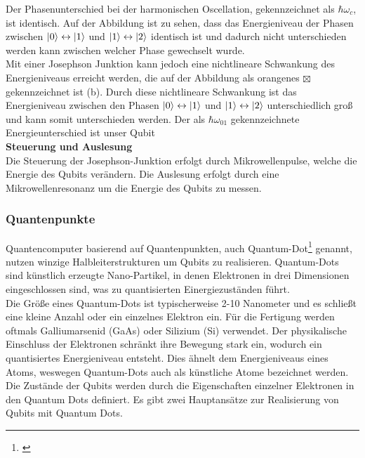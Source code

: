 Der Phasenunterschied bei der harmonischen Oscellation, gekennzeichnet als $\hbar\omega_c$, ist identisch. Auf der Abbildung ist zu sehen, dass das Energieniveau der Phasen zwischen $\ket{0} \leftrightarrow \ket{1}$
und $\ket{1} \leftrightarrow \ket{2}$ identisch ist und dadurch nicht unterschieden werden kann zwischen welcher Phase gewechselt wurde.\\

Mit einer Josephson Junktion kann jedoch eine nichtlineare Schwankung des Energieniveaus erreicht werden, die auf der Abbildung als orangenes $\boxtimes$ gekennzeichnet ist (b).
Durch diese nichtlineare Schwankung ist das Energieniveau zwischen den Phasen $\ket{0} \leftrightarrow \ket{1}$ und $\ket{1} \leftrightarrow \ket{2}$ unterschiedlich groß und kann somit unterschieden werden.
Der als $\hbar\omega_{01}$ gekennzeichnete Energieunterschied ist unser Qubit\\

\textbf{Steuerung und Auslesung}\\
Die Steuerung der Josephson-Junktion erfolgt durch Mikrowellenpulse, welche die Energie des Qubits verändern. Die Auslesung erfolgt durch eine Mikrowellenresonanz um die Energie des Qubits zu messen.\\

\subsubsection{Quantenpunkte}
\label{subsub:quantenpunkte}
Quantencomputer basierend auf Quantenpunkten, auch Quantum-Dot\footnote{\cite{loss_quantum_1998}} genannt, nutzen winzige Halbleiterstrukturen um Qubits zu realisieren.
Quantum-Dots sind künstlich erzeugte Nano-Partikel, in denen Elektronen in drei Dimensionen eingeschlossen sind, was zu quantisierten Einergiezuständen führt.\\

Die Größe eines Quantum-Dots ist typischerweise 2-10 Nanometer und es schließt eine kleine Anzahl oder ein einzelnes Elektron ein.
Für die Fertigung werden oftmals Galliumarsenid (GaAs) oder Silizium (Si) verwendet. Der physikalische Einschluss der Elektronen schränkt ihre
Bewegung stark ein, wodurch ein quantisiertes Energieniveau entsteht. Dies ähnelt dem Energieniveaus eines Atoms, weswegen Quantum-Dots auch als künstliche Atome bezeichnet werden.\\

Die Zustände der Qubits werden durch die Eigenschaften einzelner Elektronen in den Quantum Dots definiert. Es gibt zwei Hauptansätze zur Realisierung von Qubits mit Quantum Dots.\\

